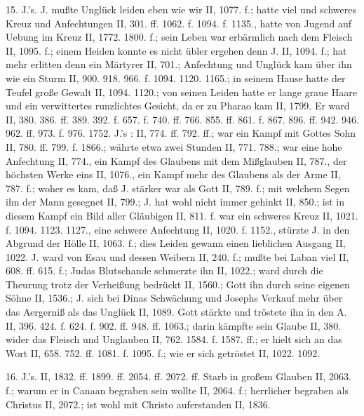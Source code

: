 15.  J.’s. J. mußte Unglück leiden eben wie wir II, 1077. f.; hatte viel und schweres Kreuz und Anfechtungen II, 301. ff. 1062. f. 1094. f. 1135., hatte von Jugend auf Uebung im Kreuz II, 1772. 1800. f.; sein Leben war erbärmlich nach dem Fleisch II, 1095. f.; einem Heiden konnte es nicht übler ergehen denn J. II, 1094. f.; hat mehr erlitten denn ein Märtyrer II, 701.; Anfechtung und Unglück kam über ihn wie ein Sturm II, 900. 918. 966. f. 1094. 1120. 1165.; in seinem Hause hatte der Teufel große Gewalt II, 1094. 1120.; von seinen Leiden hatte er lange graue Haare und ein verwittertes runzlichtes Gesicht, da er zu Pharao kam II, 1799. Er ward  II, 380. 386. ff. 389. 392. f. 657. f. 740. ff. 766. 855. ff. 861. f. 867. 896. ff. 942. 946. 962. ff. 973. f. 976. 1752. J.’s : II, 774. ff. 792. ff.; war ein Kampf mit Gottes Sohn II, 780. ff. 799. f. 1866.; währte etwa zwei Stunden II, 771. 788.; war eine hohe Anfechtung II, 774., ein Kampf des Glaubens mit dem Mißglauben II, 787., der höchsten Werke eins II, 1076., ein Kampf mehr des Glaubens als der Arme II, 787. f.; woher es kam, daß J. stärker war als Gott II, 789. f.; mit welchem Segen ihn der Mann gesegnet II, 799.; J. hat wohl nicht immer gehinkt II, 850.; ist in diesem Kampf ein Bild aller Gläubigen II, 811. f.  war ein schweres Kreuz II, 1021. f. 1094. 1123. 1127., eine schwere Anfechtung II, 1020. f. 1152., stürzte J. in den Abgrund der Hölle II, 1063. f.; dies Leiden gewann einen lieblichen Ausgang II, 1022. J. ward von Esau und dessen Weibern  II, 240. f.; mußte bei Laban viel  II, 608. ff. 615. f.; Judas Blutschande schmerzte ihn II, 1022.; ward durch die Theurung trotz der Verheißung bedrückt II, 1560.; Gott  ihn durch seine eigenen Söhne II, 1536.; J.  sich bei Dinas Schwächung und Josephs Verkauf mehr über das Aergerniß als das Unglück II, 1089. Gott stärkte und tröstete ihn in den A. II, 396. 424. f. 624. f. 902. ff. 948. ff. 1063.; darin kämpfte sein Glaube II, 380. wider das Fleisch und Unglauben II, 762. 1584. f. 1587. ff.; er hielt sich an das Wort II, 658. 752. ff. 1081. f. 1095. f.; wie er sich getröstet II, 1022. 1092.

16.  J.’s. II, 1832. ff. 1899. ff. 2054. ff. 2072. ff. Starb in großem Glauben II, 2063. f.; warum er in Canaan begraben sein wollte II, 2064. f.; herrlicher begraben als Christus II, 2072.; ist wohl mit Christo auferstanden II, 1836.

